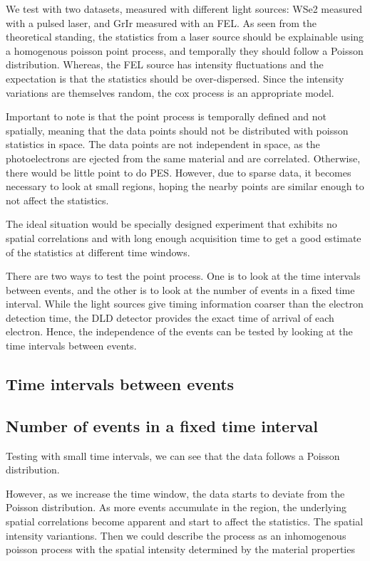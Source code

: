 We test with two datasets, measured with different light sources: \gls{WSe2} measured with a pulsed laser, and \gls{GrIr} measured with an \gls{FEL}. As seen from the theoretical standing, the statistics from a laser source should be explainable using a homogenous poisson point process, and temporally they should follow a Poisson distribution.
Whereas, the \gls{FEL} source has intensity fluctuations and the expectation is that the statistics should be over-dispersed. Since the intensity variations are themselves random, the cox process is an appropriate model.

Important to note is that the point process is temporally defined and not spatially, meaning that the data points should not be distributed with poisson statistics in space. The data points are not independent in space, as the photoelectrons are ejected from the same material and are correlated. Otherwise, there would be little point to do \gls{PES}.
However, due to sparse data, it becomes necessary to look at small regions, hoping the nearby points are similar enough to not affect the statistics.

The ideal situation would be specially designed experiment that exhibits no spatial correlations and with long enough acquisition time to get a good estimate of the statistics at different time windows.

There are two ways to test the point process. One is to look at the time intervals between events, and the other is to look at the number of events in a fixed time interval. While the light sources give timing information coarser than the electron detection time, the \gls{DLD} detector provides the exact time of arrival of each electron. Hence, the independence of the events can be tested by looking at the time intervals between events.

\subsection{Time intervals between events}


\subsection{Number of events in a fixed time interval}
Testing with small time intervals, we can see that the data follows a Poisson distribution.

However, as we increase the time window, the data starts to deviate from the Poisson distribution. As more events accumulate in the region, the underlying spatial correlations become apparent and start to affect the statistics. The spatial intensity variantions. Then we could describe the process as an inhomogenous poisson process with the spatial intensity determined by the material properties

